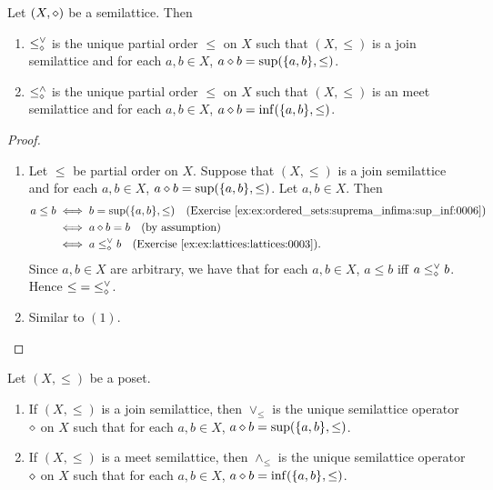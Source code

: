 \documentclass{book}
\begin{document}
	\begin{ex} 
		Let $(X, \diamond)$ be a semilattice. Then 
		\begin{enumerate}
			\item $\leq_{\diamond}^{\vee}$ is the unique partial order ${\leq}$ on $X$ such that $(X, \leq)$ is a join semilattice and for each $a,b \in X$, $a \diamond b = \sup (\{a,b\}, \leq)$.
			\item $\leq_{\diamond}^{\wedge}$ is the unique partial order ${\leq}$ on $X$ such that $(X, \leq)$ is an meet semilattice and for each $a,b \in X$, $a \diamond b = \inf (\{a,b\}, \leq)$.
		\end{enumerate}
	\end{ex}
	
	\begin{proof}\
		\begin{enumerate}
			\item Let $\leq$ be partial order on $X$. Suppose that $(X, \leq)$ is a join semilattice and for each $a,b \in X$, $a \diamond b = \sup (\{a,b\}, \leq)$. Let $a,b \in X$. Then 
			\begin{align*}
				a \leq b
				& \iff b = \sup(\{a,b\}, \leq) \quad \text{(\rex{ex:ordered_sets:suprema_infima:sup_inf:0006})} \\
				& \iff a \dmd b = b  \quad \text{(by assumption)} \\
				& \iff a \leq_{\dmd}^{\vee} b \quad \text{(\rex{ex:lattices:lattices:0003})}.
			\end{align*}
			Since $a,b \in X$ are arbitrary, we have that for each $a,b \in X$, $a \leq b$ iff $a \leq_{\diamond}^{\vee} b$. Hence ${\leq}= {\leq_{\diamond}^{\vee}}$. 
			\item Similar to $(1)$.
		\end{enumerate}
	\end{proof}
	
	\begin{ex} 
		Let $(X, \leq)$ be a poset. 
		\begin{enumerate}
			\item If $(X, \leq)$ is a join semilattice, then $\vee_{\leq}$ is the unique semilattice operator $\diamond$ on $X$ such that for each $a,b \in X$, $a \diamond b = \sup (\{a,b\}, \leq)$.
			\item If $(X, \leq)$ is a meet semilattice, then $\wedge_{\leq}$ is the unique semilattice operator $\diamond$ on $X$ such that for each $a,b \in X$, $a \diamond b = \inf (\{a,b\}, \leq)$.
		\end{enumerate}
	\end{ex}
	
\end{document}
